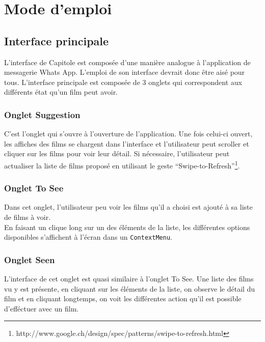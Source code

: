 \chapter{Mode d'emploi}

\section{Interface principale}

L'interface de Capitole est composée d'une manière analogue à l'application de messagerie Whats App. L'emploi de son interface devrait donc être aisé pour tous. L'interface principale est composée de 3 onglets qui correspondent aux différents état qu'un film peut avoir. 

\subsection*{Onglet Suggestion}
C'est l'onglet qui s'ouvre à l'ouverture de l'application. Une fois celui-ci ouvert, les affiches des films se chargent dans l'interface et l'utilisateur peut scroller et cliquer sur les films pour voir leur détail. Si nécessaire, l'utilisateur peut actualiser la liste de films proposé en utilisant le geste ``Swipe-to-Refresh''\footnote{http://www.google.ch/design/spec/patterns/swipe-to-refresh.html}.

\subsection*{Onglet To See}
Dans cet onglet, l'utilisateur peu voir les films qu'il a choisi est ajouté à sa liste de films à voir.\\
En faisant un clique long sur un des éléments de la liste, les différentes options disponibles s'affichent à l'écran dans un \texttt{ContextMenu}.

\subsection*{Onglet Seen}
L'interface de cet onglet est quasi similaire à l'onglet To See. Une liste des films vu y est présente, en cliquant sur les éléments de la liste, on observe le détail du film et en cliquant longtemps, on voit les différentes action qu'il est possible d'efféctuer avec un film.

